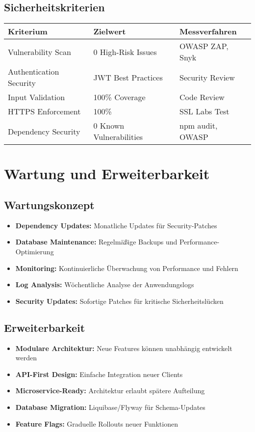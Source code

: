 \documentclass[a4paper,12pt]{article}
\begin{document}
\subsection{Sicherheitskriterien}
\begin{longtable}{|p{}|p{}|p{}|}
\hline
\textbf{Kriterium} & \textbf{Zielwert} & \textbf{Messverfahren} \\
\hline
Vulnerability Scan & 0 High-Risk Issues & OWASP ZAP, Snyk \\
\hline
Authentication Security & JWT Best Practices & Security Review \\
\hline
Input Validation & 100\% Coverage & Code Review \\
\hline
HTTPS Enforcement & 100\% & SSL Labs Test \\
\hline
Dependency Security & 0 Known Vulnerabilities & npm audit, OWASP \\
\hline
\end{longtable}

\section{Wartung und Erweiterbarkeit}

\subsection{Wartungskonzept}
\begin{itemize}
    \item \textbf{Dependency Updates:} Monatliche Updates für Security-Patches
    \item \textbf{Database Maintenance:} Regelmäßige Backups und Performance-Optimierung
    \item \textbf{Monitoring:} Kontinuierliche Überwachung von Performance und Fehlern
    \item \textbf{Log Analysis:} Wöchentliche Analyse der Anwendungslogs
    \item \textbf{Security Updates:} Sofortige Patches für kritische Sicherheitslücken
\end{itemize}

\subsection{Erweiterbarkeit}
\begin{itemize}
    \item \textbf{Modulare Architektur:} Neue Features können unabhängig entwickelt werden
    \item \textbf{API-First Design:} Einfache Integration neuer Clients
    \item \textbf{Microservice-Ready:} Architektur erlaubt spätere Aufteilung
    \item \textbf{Database Migration:} Liquibase/Flyway für Schema-Updates
    \item \textbf{Feature Flags:} Graduelle Rollouts neuer Funktionen
\end{itemize}
\end{document}
